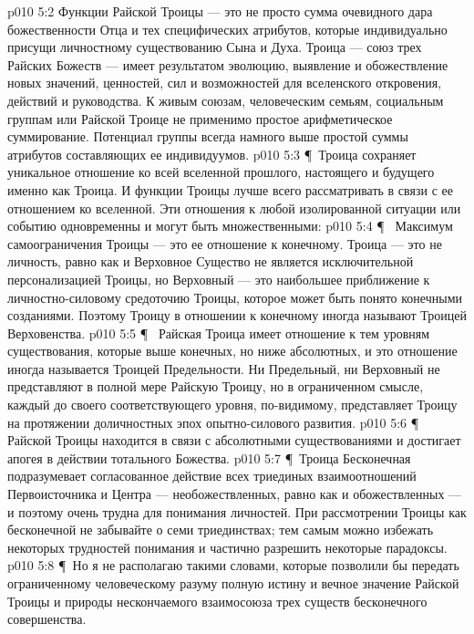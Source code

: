 \vs p010 5:2 Функции Райской Троицы --- это не просто сумма очевидного дара божественности Отца и тех специфических атрибутов, которые индивидуально присущи личностному существованию Сына и Духа. Троица --- союз трех Райских Божеств --- имеет результатом эволюцию, выявление и обожествление новых значений, ценностей, сил и возможностей для вселенского откровения, действий и руководства. К живым союзам, человеческим семьям, социальным группам или Райской Троице не применимо простое арифметическое суммирование. Потенциал группы всегда намного выше простой суммы атрибутов составляющих ее индивидуумов.
\vs p010 5:3 \P\ Троица сохраняет уникальное отношение ко всей вселенной прошлого, настоящего и будущего именно как Троица. И функции Троицы лучше всего рассматривать в связи с ее отношением ко вселенной. Эти отношения к любой изолированной ситуации или событию одновременны и могут быть множественными:
\vs p010 5:4 \P\ \bibnobreakspace {} Максимум самоограничения Троицы --- это ее отношение к конечному. Троица --- это не личность, равно как и Верховное Существо не является исключительной персонализацией Троицы, но Верховный --- это наибольшее приближение к личностно\hyp{}силовому средоточию Троицы, которое может быть понято конечными созданиями. Поэтому Троицу в отношении к конечному иногда называют Троицей Верховенства.
\vs p010 5:5 \P\ \bibnobreakspace {} Райская Троица имеет отношение к тем уровням существования, которые выше конечных, но ниже абсолютных, и это отношение иногда называется Троицей Предельности. Ни Предельный, ни Верховный не представляют в полной мере Райскую Троицу, но в ограниченном смысле, каждый до своего соответствующего уровня, по\hyp{}видимому, представляет Троицу на протяжении доличностных эпох опытно\hyp{}силового развития.
\vs p010 5:6 \P\ \bibnobreakspace {} Райской Троицы находится в связи с абсолютными существованиями и достигает апогея в действии тотального Божества.
\vs p010 5:7 \P\ Троица Бесконечная подразумевает согласованное действие всех триединых взаимоотношений Первоисточника и Центра --- необожествленных, равно как и обожествленных --- и поэтому очень трудна для понимания личностей. При рассмотрении Троицы как бесконечной не забывайте о семи триединствах; тем самым можно избежать некоторых трудностей понимания и частично разрешить некоторые парадоксы.
\vs p010 5:8 \P\ Но я не располагаю такими словами, которые позволили бы передать ограниченному человеческому разуму полную истину и вечное значение Райской Троицы и природы нескончаемого взаимосоюза трех существ бесконечного совершенства.
